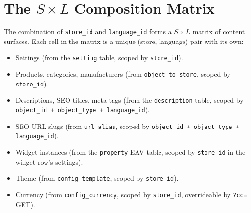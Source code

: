 \documentclass[11pt,a4paper]{article}
\begin{document}
\section{The $S \times L$ Composition Matrix}\label{sec:composition-matrix}

The combination of \texttt{store\_id} and \texttt{language\_id} forms a
$S \times L$ matrix of content surfaces. Each cell in the matrix is a
unique (store, language) pair with its own:

\begin{itemize}[leftmargin=1.6em,itemsep=2pt]
  \item Settings (from the \texttt{setting} table, scoped by
        \texttt{store\_id}).
  \item Products, categories, manufacturers (from
        \texttt{object\_to\_store}, scoped by \texttt{store\_id}).
  \item Descriptions, SEO titles, meta tags (from the
        \texttt{description} table, scoped by
        \texttt{object\_id + object\_type + language\_id}).
  \item SEO URL slugs (from \texttt{url\_alias}, scoped by
        \texttt{object\_id + object\_type + language\_id}).
  \item Widget instances (from the \texttt{property} EAV table, scoped
        by \texttt{store\_id} in the widget row's settings).
  \item Theme (from \texttt{config\_template}, scoped by
        \texttt{store\_id}).
  \item Currency (from \texttt{config\_currency}, scoped by
        \texttt{store\_id}, overrideable by \texttt{?cc=} GET).
\end{itemize}
\end{document}
